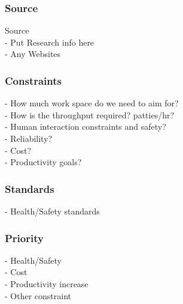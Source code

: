 \subsubsection{Source}
Source \\
- Put Research info here\\
- Any Websites
\subsubsection{Constraints}
- How much work space do we need to aim for?\\
- How is the throughput required? patties/hr?\\
- Human interaction constraints and safety?\\
- Reliability? \\
- Cost? \\
- Productivity goals?
\subsubsection{Standards}
- Health/Safety standards\\
\subsubsection{Priority}
- Health/Safety\\
- Cost\\
- Productivity increase \\
- Other constraint\\